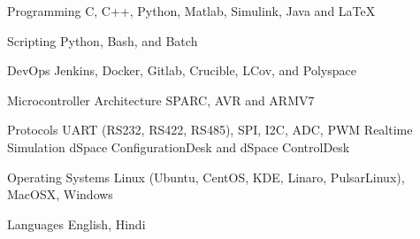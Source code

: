 

\begin{cvskills}

  \cvskill
    {Programming} %
    {C, C++, Python, Matlab, Simulink, Java and LaTeX} %

%
  \cvskill
    {Scripting} %
    {Python, Bash, and Batch} %

%
  \cvskill
    {DevOps} %
    {Jenkins, Docker, Gitlab, Crucible, LCov, and Polyspace} %

  \cvskill
    {Microcontroller Architecture} %
    {SPARC, AVR and ARMV7} %

  \cvskill
    {Protocols} %
	{UART (RS232, RS422, RS485), SPI, I2C, ADC, PWM} %
  \cvskill
    {Realtime Simulation} %
    {dSpace ConfigurationDesk and dSpace ControlDesk} %

  \cvskill
    {Operating Systems} %
    {Linux (Ubuntu, CentOS, KDE, Linaro, PulsarLinux), MacOSX, Windows} %

  \cvskill
    {Languages} %
    {English, Hindi} %

\end{cvskills}
